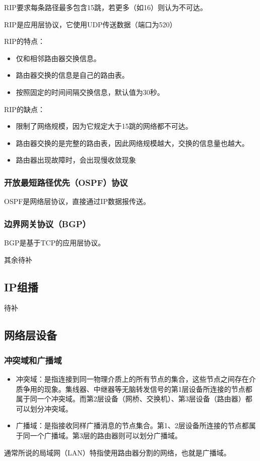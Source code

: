 \documentclass[12pt, a4paper, oneside]{ctexart}
\begin{document}
RIP要求每条路径最多包含15跳，若更多（如16）则认为不可达。

RIP是应用层协议，它使用UDP传送数据（端口为520）

RIP的特点：
\begin{itemize}
    \item 仅和相邻路由器交换信息。
    \item 路由器交换的信息是自己的路由表。
    \item 按照固定的时间间隔交换信息，默认值为30秒。
\end{itemize}

RIP的缺点：
\begin{itemize}
    \item 限制了网络规模，因为它规定大于15跳的网络都不可达。
    \item 路由器交换的是完整的路由表，因此网络规模越大，交换的信息量也越大。
    \item 路由器出现故障时，会出现慢收敛现象
\end{itemize}

\subsubsection{开放最短路径优先（OSPF）协议}

OSPF是网络层协议，直接通过IP数据报传送。

\subsubsection{边界网关协议（BGP）}

BGP是基于TCP的应用层协议。

其余待补

\subsection{IP组播}

待补

\subsection{网络层设备}

\subsubsection{冲突域和广播域}

\begin{itemize}
    \item 冲突域：是指连接到同一物理介质上的所有节点的集合，这些节点之间存在介质争用的现象。集线器、中继器等无脑转发信号的第1层设备所连接的节点都属于同一个冲突域。而第2层设备（网桥、交换机）、第3层设备（路由器）都可以划分冲突域。
    \item 广播域：是指接收同样广播消息的节点集合。第1、2层设备所连接的节点都属于同一个广播域。第3层的路由器则可以划分广播域。
\end{itemize}
通常所说的局域网（LAN）特指使用路由器分割的网络，也就是广播域。
\end{document}
